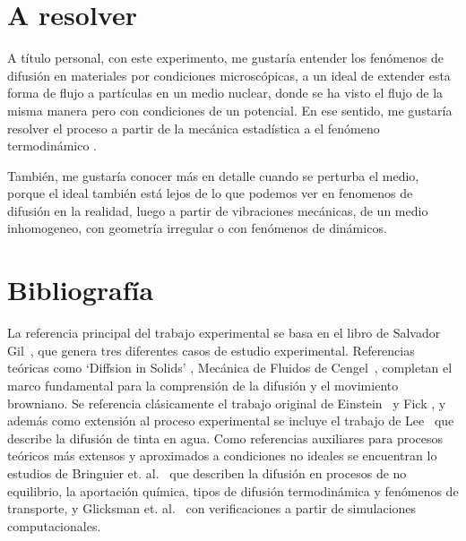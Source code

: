 \documentclass{article}[13pt]
\begin{document}
\section*{A resolver}
A título personal, con este experimento, me gustaría entender los fenómenos de difusión en materiales por condiciones microscópicas, a un ideal de extender esta forma de flujo a partículas en un medio nuclear, donde se ha visto el flujo de la misma manera pero con condiciones de un potencial. En ese sentido, me gustaría resolver el proceso a partir de la mecánica estadística a el fenómeno termodinámico \cite{reif2009fundamentals}.

También, me gustaría conocer más en detalle cuando se perturba el medio, porque el ideal también está lejos de lo que podemos ver en fenomenos de difusión en la realidad, luego a partir de vibraciones mecánicas, de un medio inhomogeneo, con geometría irregular o con fenómenos de dinámicos.

\section*{Bibliografía}
La referencia principal del trabajo experimental se basa en el libro de Salvador Gil~\cite{gilExperimentosFisicaUsando2014}, que genera tres diferentes casos de estudio experimental. Referencias teóricas como `Diffsion in Solids' \cite{mehrerHistoryBibliographyDiffusion2007}, Mecánica de Fluidos de Cengel~\cite{çengel2006mecánica}, completan el marco fundamental para la comprensión de la difusión y el movimiento browniano. Se referencia clásicamente el trabajo original de Einstein~\cite{einsteinUberMolekularkinetischenTheorie1905} y Fick \cite{fickLiquidDiffusion1995}, y además como extensión al proceso experimental se incluye el trabajo de Lee~\cite{leeInkDifussionWater2004} que describe la difusión de tinta en agua. Como referencias auxiliares para procesos teóricos más extensos y aproximados a condiciones no ideales se encuentran lo estudios de Bringuier et. al.~\cite{Bringuier_2009} que describen la difusión en procesos de no equilibrio, la aportación química, tipos de difusión termodinámica y fenómenos de transporte, y Glicksman et. al.~\cite{didomizioSimulationFicksVerification2006} con verificaciones a partir de simulaciones computacionales.



\end{document}

